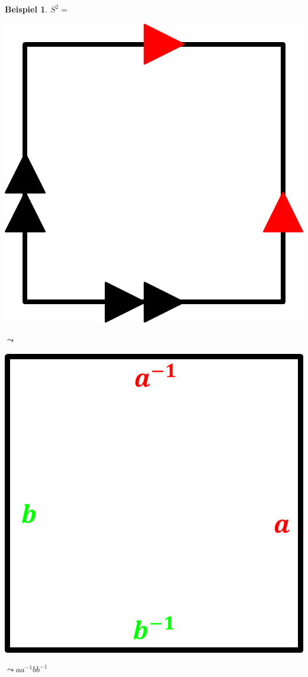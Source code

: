 \documentclass[a4paper,11pt,notitlepage]{report}
\theoremstyle{definition}
\newtheorem{example}{Beispiel}[chapter]
\begin{document}
\begin{example}
	$S^2 = $ \begin{center}
	 	\includegraphics[scale=0.5]{images/2012_01_10_Bild10.png}
	 \end{center} $\leadsto$ \begin{center}
	 	\includegraphics[scale=0.5]{images/2012_01_10_Bild11.png}
	 \end{center} $\leadsto a a^{-1} b b^{-1}$ 
\end{example}
\end{document}
